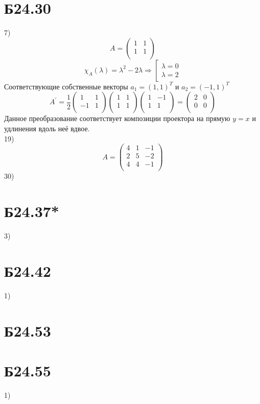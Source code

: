 \section*{Б24.30}
7)$$A=\begin{pmatrix*}
    1&1\\
    1&1\\
\end{pmatrix*}$$
$$\chi_A(\lambda)=\lambda^2-2\lambda\Rightarrow\left[\begin{matrix}
    \lambda=0\\
    \lambda=2
\end{matrix}\right.$$
Соответствующие собственные векторы $a_1=(1,1)^{T}$ и $a_2=(-1,1)^{T}$
$$A^{\prime}=\frac{1}{2}\begin{pmatrix*}
    1&1\\
    -1&1\\
\end{pmatrix*}\begin{pmatrix*}
    1&1\\
    1&1\\
\end{pmatrix*}\begin{pmatrix*}
    1&-1\\
    1&1\\
\end{pmatrix*}=\begin{pmatrix*}
    2&0\\
    0&0\\
\end{pmatrix*}$$
Данное преобразование соответствует композиции проектора на прямую $y=x$ и удлинения вдоль неё вдвое.\\
19)$$A=\begin{pmatrix*}
    4&1&-1\\
    2&5&-2\\
    4&4&-1\\
\end{pmatrix*}$$
30)
\section*{Б24.37*}3)
\section*{Б24.42}1)
\section*{Б24.53}
\section*{Б24.55}1)

